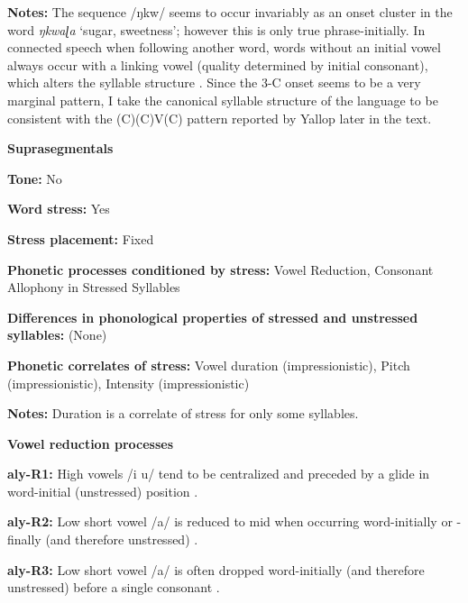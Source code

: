 \textbf{Notes:} The sequence /ŋkw/ seems to occur invariably as an onset cluster in the word \textit{ŋkwaɭa} ‘sugar, sweetness’; however this is only true phrase-initially. In connected speech when following another word, words without an initial vowel always occur with a linking vowel (quality determined by initial consonant), which alters the syllable structure \citep[28-30]{Yallop1977}. Since the 3-C onset seems to be a very marginal pattern, I take the canonical syllable structure of the language to be consistent with the (C)(C)V(C) pattern reported by Yallop later in the text.



\textbf{Suprasegmentals}



\textbf{Tone:} No



\textbf{Word stress:} Yes



\textbf{Stress placement:} Fixed



\textbf{Phonetic processes conditioned by stress:} Vowel Reduction, Consonant Allophony in Stressed Syllables



\textbf{Differences in phonological properties of stressed and unstressed syllables:} (None)



\textbf{Phonetic correlates of stress:} Vowel duration (impressionistic), Pitch (impressionistic), Intensity (impressionistic)



\textbf{Notes:} Duration is a correlate of stress for only some syllables.



\textbf{Vowel reduction processes}



\textbf{aly-R1:} High vowels /i u/ tend to be centralized and preceded by a glide in word-initial (unstressed) position \citep[25]{Yallop1977}.



\textbf{aly-R2:} Low short vowel /a/ is reduced to mid when occurring word-initially or -finally (and therefore unstressed) \citep[25]{Yallop1977}.



\textbf{aly-R3:} Low short vowel /a/ is often dropped word-initially (and therefore unstressed) before a single consonant \citep[28]{Yallop1977}.



